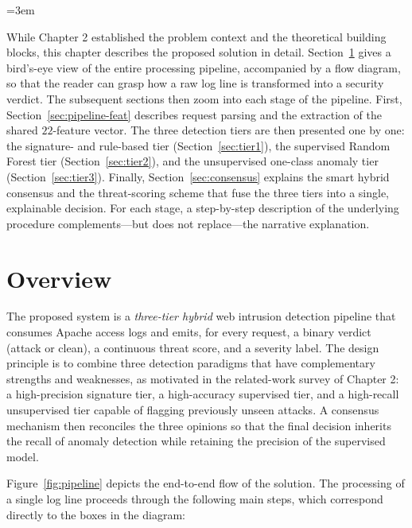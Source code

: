 \documentclass[../main.tex]{subfiles}
\begin{document}
\emergencystretch=3em
\renewcommand{\_}{\textunderscore\allowbreak}
\raggedbottom

While Chapter 2 established the problem context and the
theoretical building blocks, this chapter describes the proposed solution
in detail. Section~\ref{sec:overview} gives a bird's-eye view of the entire
processing pipeline, accompanied by a flow diagram, so that the reader can
grasp how a raw log line is transformed into a security verdict. The
subsequent sections then zoom into each stage of the pipeline. First,
Section~\ref{sec:pipeline-feat} describes request parsing and the
extraction of the shared $22$-feature vector. The three detection tiers are
then presented one by one: the signature- and rule-based tier
(Section~\ref{sec:tier1}), the supervised Random Forest tier
(Section~\ref{sec:tier2}), and the unsupervised one-class anomaly tier
(Section~\ref{sec:tier3}). Finally, Section~\ref{sec:consensus} explains the
smart hybrid consensus and the threat-scoring scheme that fuse the three
tiers into a single, explainable decision. For each stage, a step-by-step
description of the underlying procedure complements---but does not
replace---the narrative explanation.

\section{Overview}
\label{sec:overview}

The proposed system is a \emph{three-tier hybrid} web intrusion detection
pipeline that consumes Apache access logs and emits, for every request, a
binary verdict (attack or clean), a continuous threat score, and a severity
label. The design principle is to combine three detection paradigms that
have complementary strengths and weaknesses, as motivated in
the related-work survey of Chapter 2: a high-precision signature tier, a
high-accuracy supervised tier, and a high-recall unsupervised tier capable
of flagging previously unseen attacks. A consensus mechanism then reconciles
the three opinions so that the final decision inherits the recall of anomaly
detection while retaining the precision of the supervised model.

Figure~\ref{fig:pipeline} depicts the end-to-end flow of the solution. The
processing of a single log line proceeds through the following main steps,
which correspond directly to the boxes in the diagram:
\end{document}
